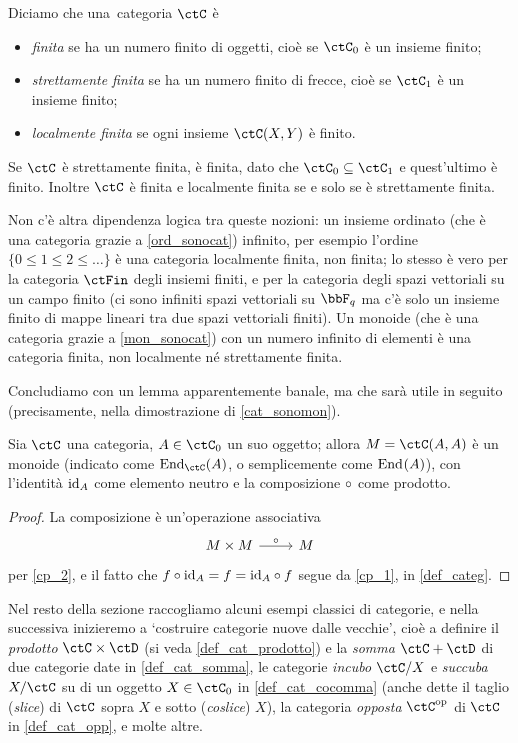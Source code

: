 \begin{definition}\label{cat_finita_locfinita}
	Diciamo che una~categoria \(\ctC\) è
	\begin{itemize}
		\item \emph{finita} se ha un numero finito di oggetti, cioè se \(\ctC_0\) è un insieme finito;
		\item \emph{strettamente finita} se ha un numero finito di frecce, cioè se \(\ctC_1\) è un insieme finito;
		\item \emph{localmente finita} se ogni insieme \(\Hom\ctC(X,Y)\) è finito.
	\end{itemize}
	Se \(\ctC\) è strettamente finita, è finita, dato che \(\ctC_0\subseteq\ctC_1\) e quest'ultimo è finito. Inoltre \(\ctC\) è finita e localmente finita se e solo se è strettamente finita.

	Non c'è altra dipendenza logica tra queste nozioni: un insieme ordinato (che è una categoria grazie a \ref{ord_sonocat}) infinito, per esempio l'ordine \(\{0\le 1 \le 2 \le\dots\}\) è una categoria localmente finita, non finita; lo stesso è vero per la categoria \(\ctFin\) degli insiemi finiti, e per la categoria degli spazi vettoriali su un campo finito (ci sono infiniti spazi vettoriali su \(\bbF_q\) ma c'è solo un insieme finito di mappe lineari tra due spazi vettoriali finiti). Un monoide (che è una categoria grazie a \ref{mon_sonocat}) con un numero infinito di elementi è una categoria finita, non localmente né strettamente finita.
\end{definition}
Concludiamo con un lemma apparentemente banale, ma che sarà utile in seguito (precisamente, nella dimostrazione di \ref{cat_sonomon}).
\begin{lemma}\label{lem_end_monoide}
	Sia \(\ctC\) una categoria, \(A\in\ctC_0\) un suo oggetto; allora \(M=\Hom{\ctC}(A,A)\) è un monoide (indicato come \(\End[\ctC]{A}\), o semplicemente come \(\mathrm{End}_{}(A)\)), con l'identità \(\mathrm{id}_A\) come elemento neutro e la composizione \(\circ\) come prodotto.
\end{lemma}
\begin{proof}
	La composizione è un'operazione associativa
	\[\begin{tikzcd}
			M\times M \ar[r, "\cmp"] & M
		\end{tikzcd}\]
	per \ref{cp_2}, e il fatto che \(f\circ \mathrm{id}_A=f=\mathrm{id}_A\circ f\) segue da \ref{cp_1}, in \ref{def_categ}.
\end{proof}
Nel resto della sezione raccogliamo alcuni esempi classici di categorie, e nella successiva inizieremo a `costruire categorie nuove dalle vecchie', cioè a definire il \emph{prodotto} \(\ctC\times\ctD\) (si veda \ref{def_cat_prodotto}) e la \emph{somma} \(\ctC+\ctD\) di due categorie date in \ref{def_cat_somma}, le categorie \emph{incubo} \(\ctC/X\) e \emph{succuba} \(X/\ctC\) su di un oggetto \(X\in\ctC_0\) in \ref{def_cat_cocomma} (anche dette il taglio (\emph{slice}) di \(\ctC\) sopra \(X\) e sotto (\emph{coslice}) \(X\)), la categoria \emph{opposta} \(\ctC^\op\) di \(\ctC\) in \ref{def_cat_opp}, e molte altre.

